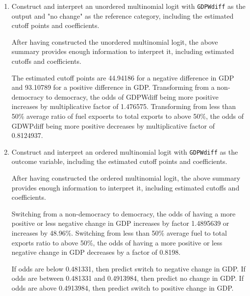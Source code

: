 \documentclass[12pt,letterpaper]{article}
\begin{document}
\begin{enumerate}
	\item Construct and interpret an unordered multinomial logit with \texttt{GDPWdiff} as the output and "no change" as the reference category, including the estimated cutoff points and coefficients.
	
	  
	
	After having constructed the unordered multinomial logit, the above summary provides enough information to interpret it, including estimated cutoffs and coefficients.
	
	  
	
	The estimated cutoff points are 44.94186 for a negative difference in GDP and 93.10789 for a positive difference in GDP.
	Transforming from a non-democracy to democracy, the odds of GDPWdiff being more positive increases by multiplicative factor of 1.476575.
	Transforming from less than 50\% average ratio of fuel expoerts to total exports to above 50\%, the odds of GDWPdiff being more positive decreases by multiplicative factor of 0.8124937.
	
	\item Construct and interpret an ordered multinomial logit with \texttt{GDPWdiff} as the outcome variable, including the estimated cutoff points and coefficients.
	
	  
	
	After having constructed the ordered multinomial logit, the above summary provides enough information to interpret it, including estimated cutoffs and coefficients.
	
	  
	
	Switching from a non-democracy to democracy, the odds of having a more positive or less negative change in GDP increases by factor 1.4895639 or increases by 48.96\%.
	Switching from less than 50\% average fuel to total exports ratio to above 50\%, the odds of having a more positive or less negative change in GDP decreases by a factor of 0.8198.
	
	  
	
	If odds are below 0.481331, then predict switch to negative change in GDP.
	If odds are between 0.481331 and 0.4913984, then predict no change in GDP.
	If odds are above 0.4913984, then predict switch to positive change in GDP.
	
	
	
\end{enumerate}
\end{document}
